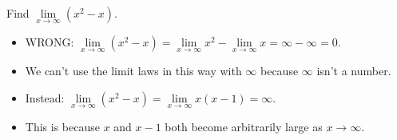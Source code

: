 \begin{frame}
\begin{example}
Find $\lim\limits_{x\rightarrow \infty}(x^2-x)$.
\begin{itemize}
\item<2-| alert@2->  WRONG: $\lim\limits_{x\to\infty} (x^2-x) = \lim\limits_{x\to\infty}x^2-\lim\limits_{x\to\infty} x = \infty-\infty = 0$.
\item<3->  We can't use the limit laws in this way with $\infty$ because $\infty$ isn't a number.
\item<4->  Instead: $\lim\limits_{x\to \infty} (x^2-x) = \lim\limits_{x\to\infty}x(x-1) = \infty$.
\item<5->  This is because $x$ and $x-1$ both become arbitrarily large as $x\to\infty$.
\end{itemize}
\end{example}
\end{frame}
